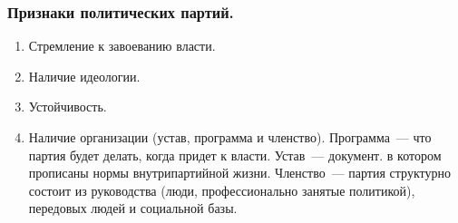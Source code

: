 \documentclass[12pt]{article}
\begin{document}
	\subsubsection{Признаки политических партий.}
	\begin{enumerate}
		\item Стремление к завоеванию власти.
		\item Наличие идеологии.
		\item Устойчивость.
		\item Наличие организации (устав, программа и членство). Программа~--- что партия будет делать, когда придет к власти. Устав~--- документ. в котором прописаны нормы внутрипартийной жизни. Членство~--- партия структурно состоит из руководства (люди, профессионально занятые политикой), передовых людей и социальной базы.
	\end{enumerate}
\end{document}
